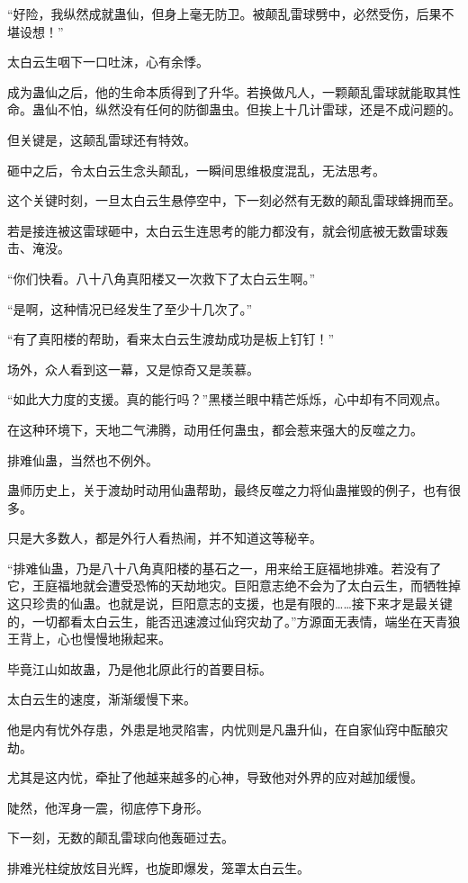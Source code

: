 \begin{this_body}
“好险，我纵然成就蛊仙，但身上毫无防卫。被颠乱雷球劈中，必然受伤，后果不堪设想！”

太白云生咽下一口吐沫，心有余悸。

成为蛊仙之后，他的生命本质得到了升华。若换做凡人，一颗颠乱雷球就能取其性命。蛊仙不怕，纵然没有任何的防御蛊虫。但挨上十几计雷球，还是不成问题的。

但关键是，这颠乱雷球还有特效。

砸中之后，令太白云生念头颠乱，一瞬间思维极度混乱，无法思考。

这个关键时刻，一旦太白云生悬停空中，下一刻必然有无数的颠乱雷球蜂拥而至。

若是接连被这雷球砸中，太白云生连思考的能力都没有，就会彻底被无数雷球轰击、淹没。

“你们快看。八十八角真阳楼又一次救下了太白云生啊。”

“是啊，这种情况已经发生了至少十几次了。”

“有了真阳楼的帮助，看来太白云生渡劫成功是板上钉钉！”

场外，众人看到这一幕，又是惊奇又是羡慕。

“如此大力度的支援。真的能行吗？”黑楼兰眼中精芒烁烁，心中却有不同观点。

在这种环境下，天地二气沸腾，动用任何蛊虫，都会惹来强大的反噬之力。

排难仙蛊，当然也不例外。

蛊师历史上，关于渡劫时动用仙蛊帮助，最终反噬之力将仙蛊摧毁的例子，也有很多。

只是大多数人，都是外行人看热闹，并不知道这等秘辛。

“排难仙蛊，乃是八十八角真阳楼的基石之一，用来给王庭福地排难。若没有了它，王庭福地就会遭受恐怖的天劫地灾。巨阳意志绝不会为了太白云生，而牺牲掉这只珍贵的仙蛊。也就是说，巨阳意志的支援，也是有限的……接下来才是最关键的，一切都看太白云生，能否迅速渡过仙窍灾劫了。”方源面无表情，端坐在天青狼王背上，心也慢慢地揪起来。

毕竟江山如故蛊，乃是他北原此行的首要目标。

太白云生的速度，渐渐缓慢下来。

他是内有忧外存患，外患是地灵陷害，内忧则是凡蛊升仙，在自家仙窍中酝酿灾劫。

尤其是这内忧，牵扯了他越来越多的心神，导致他对外界的应对越加缓慢。

陡然，他浑身一震，彻底停下身形。

下一刻，无数的颠乱雷球向他轰砸过去。

排难光柱绽放炫目光辉，也旋即爆发，笼罩太白云生。


\end{this_body}
